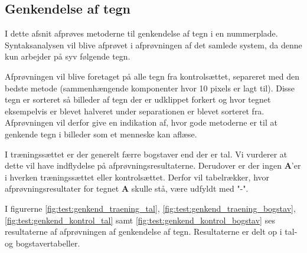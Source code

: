 \begin{comment}
Problemer ved 10: tegn der er smeltet sammen pga. søm skruer: OE26906 og ----290. Godt udskåret: UX33152, skæve plader et problem. go kontrast: YE39734.

Problemer ved 20: for stort område giver komponenter der ikke klippes bort, fordi kontrastforstærkning giver et andet resultat, her ville dynamisk kontrast-blok størrelse måske hjælpe. Dårlig indskrænk XK29750. TS57793: GOD(?) 

Problemer ve 30: stadig for stort område: giver komponenter udenfor der vælges. dårlig indskrænk, især foran? eksempler.

\end{comment}


\subsection{Genkendelse af tegn}
I dette afsnit afprøves metoderne til genkendelse af tegn i en nummerplade. Syntaksanalysen vil blive afprøvet i afprøvningen af det samlede system, da denne kun arbejder på syv følgende tegn.

Afprøvningen vil blive foretaget på alle tegn fra kontrolsættet, separeret med den bedste metode (sammenhængende komponenter hvor 10 pixels er lagt til). Disse tegn er sorteret så billeder af tegn der er udklippet forkert og hvor tegnet eksempelvis er blevet halveret under separationen er blevet sorteret fra. Afprøvningen vil derfor give en indikation af, hvor gode metoderne er til at genkende tegn i billeder som et menneske kan aflæse.

I træningssættet er der generelt færre bogstaver end der er tal. Vi vurderer at dette vil have indflydelse på afprøvningsresultaterne. Derudover er der ingen \textbf{A}'er i hverken træningssættet eller kontrolsættet. Derfor vil tabelrækker, hvor afprøvningsresultater for tegnet \textbf{A} skulle stå, være udfyldt med "-".


I figurerne \vref{fig:test:genkend_traening_tal}, \vref{fig:test:genkend_traening_bogstav}, \vref{fig:test:genkend_kontrol_tal} samt \vref{fig:test:genkend_kontrol_bogstav} ses resultaterne af afprøvningen af genkendelse af tegn. Resultaterne er delt op i tal- og bogstavertabeller.

